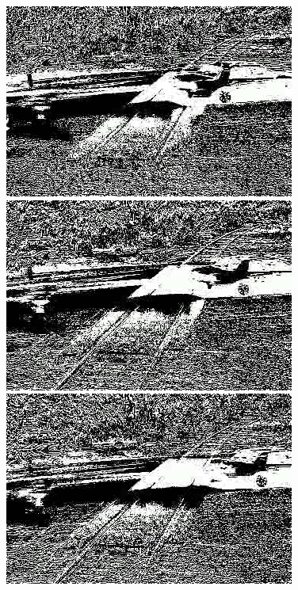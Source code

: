 \documentclass[a4paper]{ctexart}
\begin{document}
\begin{enumerate}[label=\arabic*、]
\begin{figure}[htbp]
\begin{minipage}[t]{0.2\textwidth}
		\end{minipage}
		\begin{minipage}[t]{0.2\textwidth}
			\centering
			\includegraphics[width=\textwidth]{figure/frames/avg49405.jpg}
		\end{minipage}
		\begin{minipage}[t]{0.2\textwidth}
			\centering
			\includegraphics[width=\textwidth]{figure/frames/avg49410.jpg}
		\end{minipage}
		\begin{minipage}[t]{0.2\textwidth}
			\centering
			\includegraphics[width=\textwidth]{figure/frames/avg49415.jpg}

\end{minipage}
\end{figure}
\end{enumerate}
\end{document}
